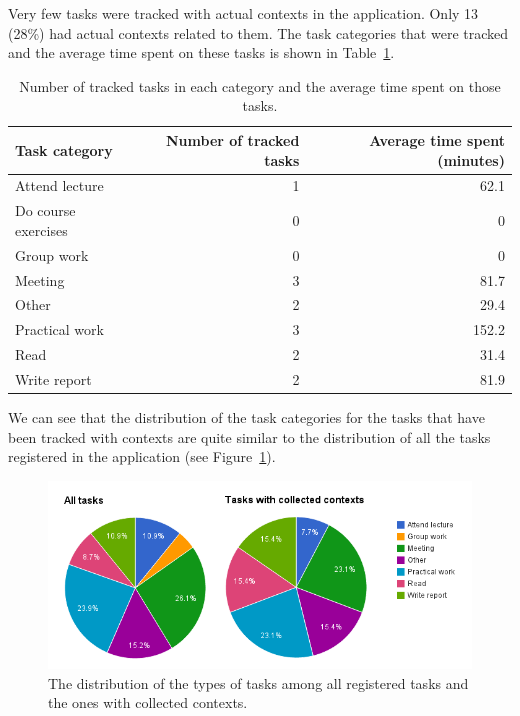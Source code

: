 Very few tasks were tracked with actual contexts in the application. Only 13 (28\%) had actual contexts related to them. The task categories that were tracked and the average time spent on these tasks is shown in Table~\ref{tab:avgtimespent}.
\begin{table}[tbp]
  \centering
  \begin{tabular}{|l|r|r|}
	\hline
	\textbf{Task category} & \textbf{Number of tracked tasks} & \textbf{Average time spent (minutes)} \\
	\hline
	Attend lecture & 1 & 62.1 \\
  \hline
	Do course exercises & 0 & 0 \\
  \hline
	Group work & 0 & 0 \\
  \hline
	Meeting & 3 & 81.7 \\
  \hline
	Other & 2 & 29.4 \\
  \hline
	Practical work & 3 & 152.2 \\
  \hline
	Read & 2 & 31.4 \\
  \hline
  Write report & 2 & 81.9 \\
  \hline
  \end{tabular}
  \caption[Time spent on tasks]{Number of tracked tasks in each category and the average time spent on those tasks.}
  \label{tab:avgtimespent}
\end{table}
We can see that the distribution of the task categories for the tasks that have been tracked with contexts are quite similar to the distribution of all the tasks registered in the application (see Figure~\ref{fig:taskdistributioncomparison}).
\begin{figure}[tbp]
  \centering
  \includegraphics[width=\textwidth]{figures/TaskDistributionComparison.png}
  \caption[All tasks and tasks with collected contexts comparison]{The distribution of the types of tasks among all registered tasks and the ones with collected contexts.}
  \label{fig:taskdistributioncomparison}
\end{figure}


